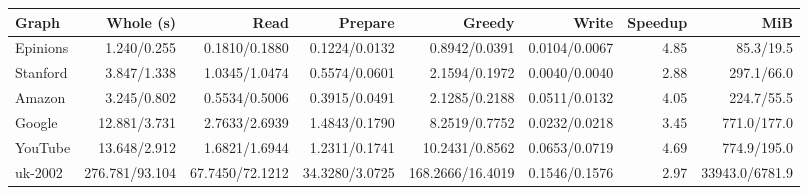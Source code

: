 \begin{tabular}{@{}lrrrrrrr@{}}
\toprule
Graph & Whole (s) & Read & Prepare & Greedy & Write & Speedup & MiB \\
\midrule
Epinions & 1.240/0.255 & 0.1810/0.1880 & 0.1224/0.0132 & 0.8942/0.0391 & 0.0104/0.0067 & 4.85 & 85.3/19.5 \\
Stanford & 3.847/1.338 & 1.0345/1.0474 & 0.5574/0.0601 & 2.1594/0.1972 & 0.0040/0.0040 & 2.88 & 297.1/66.0 \\
Amazon & 3.245/0.802 & 0.5534/0.5006 & 0.3915/0.0491 & 2.1285/0.2188 & 0.0511/0.0132 & 4.05 & 224.7/55.5 \\
Google & 12.881/3.731 & 2.7633/2.6939 & 1.4843/0.1790 & 8.2519/0.7752 & 0.0232/0.0218 & 3.45 & 771.0/177.0 \\
YouTube & 13.648/2.912 & 1.6821/1.6944 & 1.2311/0.1741 & 10.2431/0.8562 & 0.0653/0.0719 & 4.69 & 774.9/195.0 \\
uk-2002 & 276.781/93.104 & 67.7450/72.1212 & 34.3280/3.0725 & 168.2666/16.4019 & 0.1546/0.1576 & 2.97 & 33943.0/6781.9 \\
\bottomrule
\end{tabular}
